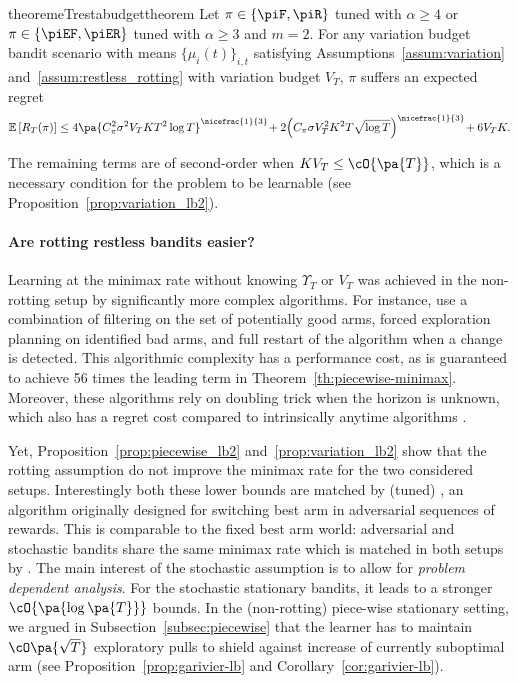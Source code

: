 \vspace{-2em}
\begin{tBox}
\begin{restatable}{theoremeT}{restabudgettheorem}
\label{th:variation-minimax}
Let $\pi \in \left\{ \piF, \piR\right\}$ tuned with $\alpha \geq 4$ or $\pi \in \left\{ \piEF, \piER\right\}$ tuned with $\alpha \geq 3$ and $m=2$. For any variation budget bandit scenario with means $\{\mu_i(t)\}_{i,t}$ satisfying Assumptions~\ref{assum:variation} and~\ref{assum:restless_rotting}  with variation budget $V_T$, $\pi$ suffers an expected regret\,
\[
\mathbb{E}\left[R_T(\pi)\right] \leq 4\pa{C_\pi^2 \sigma^2 V_T K T^2\log{T}}^{\nicefrac{1}{3}} \!+ 2\Big(C_\pi \sigma V_T^2  K^2  T \sqrt{\log{T}}\Big)^{\nicefrac{1}{3}} \!+ 6 V_T K.
\]
\end{restatable}
\end{tBox}
%
The remaining terms are of second-order when $KV_T \leq \cO{\pa{T}}$, which is a necessary condition for the problem to be learnable (see Proposition~\ref{prop:variation_lb2}). 
%
\paragraph{Are rotting restless bandits easier?} Learning at the minimax rate without knowing $\Upsilon_T$ or $V_T$ was achieved in the non-rotting setup by significantly more complex algorithms. For instance, \citet{auer2019adaptively} use a combination of filtering on the set of potentially good arms, forced exploration planning on identified bad arms, and full restart of the algorithm when a change is detected. This algorithmic complexity has a performance cost, as \ADSWITCH is guaranteed to achieve 56 times the leading term in Theorem~\ref{th:piecewise-minimax}. Moreover, these algorithms rely on doubling trick when the horizon is unknown, which also has a regret cost compared to intrinsically anytime algorithms \citep{besson2018doubling}.

Yet, Proposition~\ref{prop:piecewise_lb2}  and~\ref{prop:variation_lb2} show that the rotting assumption do not improve the minimax rate for the two considered setups. Interestingly both these lower bounds are matched by (tuned) \EXPS \citep{auer2002nonstochastic}, an algorithm originally designed for switching best arm in adversarial sequences of rewards. This is comparable to the fixed best arm world:  adversarial and stochastic bandits share the same minimax rate which is matched in both setups by \EXP. The main interest of the stochastic assumption is to allow for \textit{problem dependent analysis}. For the stochastic stationary bandits, it leads to a stronger $\cO{\pa{\log\pa{T}}}$ bounds. In the (non-rotting) piece-wise stationary setting, we argued in Subsection~\ref{subsec:piecewise} that the learner has to maintain $\cO\pa{\sqrt{T}}$ exploratory pulls to shield against increase of currently suboptimal arm (see Proposition~\ref{prop:garivier-lb} and Corollary~\ref{cor:garivier-lb}).

